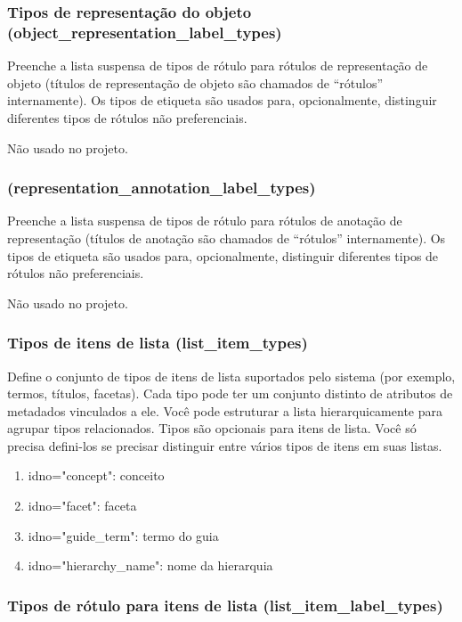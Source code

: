 \subsubsection{Tipos de representação do objeto (object\_representation\_label\_types)}
Preenche a lista suspensa de tipos de rótulo para rótulos de representação de objeto (títulos de representação de objeto são chamados de ``rótulos'' internamente). Os tipos de etiqueta são usados para, opcionalmente, distinguir diferentes tipos de rótulos não preferenciais.

Não usado no projeto.

\subsubsection{(representation\_annotation\_label\_types)}
Preenche a lista suspensa de tipos de rótulo para rótulos de anotação de representação (títulos de anotação são chamados de “rótulos” internamente). Os tipos de etiqueta são usados para, opcionalmente, distinguir diferentes tipos de rótulos não preferenciais.  

Não usado no projeto.

\subsubsection{Tipos de itens de lista (list\_item\_types)}

Define o conjunto de tipos de itens de lista suportados pelo sistema (por exemplo, termos, títulos, facetas). Cada tipo pode ter um conjunto distinto de atributos de metadados vinculados a ele. Você pode estruturar a lista hierarquicamente para agrupar tipos relacionados. Tipos são opcionais para itens de lista. Você só precisa defini-los se precisar distinguir entre vários tipos de itens em suas listas.
\begin{enumerate}
	\item idno="concept": conceito
	\item idno="facet": faceta
	\item idno="guide\_term": termo do guia
	\item idno="hierarchy\_name": nome da hierarquia
\end{enumerate}

\subsubsection{Tipos de rótulo para itens de lista (list\_item\_label\_types)}

